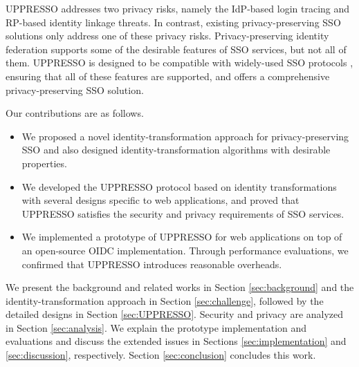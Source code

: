 
UPPRESSO addresses two privacy risks, namely the IdP-based login tracing and RP-based identity linkage threats. In contrast, existing privacy-preserving SSO solutions \cite{BrowserID, SPRESSO, NIST2017draft, FirefoxAccount} only address one of these privacy risks. Privacy-preserving identity federation \cite{PseudoID, ELPASSO, UnlimitID,Opaak,uprov,hyperledge-idemix} supports some of the desirable features of SSO services, but not all of them. UPPRESSO is designed to be compatible with widely-used SSO protocols \cite{OpenIDConnect, rfc6749, SAML, NIST2017draft}, ensuring that all of these features are supported, and offers a comprehensive privacy-preserving SSO solution.

Our contributions are as follows.
\vspace{-\topsep}\begin{itemize}
\setlength{\topsep}{0pt}
\setlength{\partopsep}{0pt}
\setlength{\itemsep}{0pt}
\setlength{\parsep}{0pt}
\setlength{\parskip}{0pt}
\item We proposed a novel identity-transformation approach for privacy-preserving SSO and also designed identity-transformation algorithms with desirable properties.
\item We developed the UPPRESSO protocol based on identity transformations    with several designs specific to web applications, and proved that UPPRESSO satisfies the security and privacy requirements of SSO services.
\item We implemented a prototype of UPPRESSO for web applications on top of an open-source OIDC implementation. Through performance evaluations, we confirmed that UPPRESSO introduces reasonable overheads.
\end{itemize}


We present the background and related works in Section \ref{sec:background} and the identity-transformation approach in Section \ref{sec:challenge}, followed by the detailed designs in Section \ref{sec:UPPRESSO}. 
Security and privacy are analyzed in Section \ref{sec:analysis}.
 We explain the prototype implementation and evaluations
  and discuss the extended issues 
    in Sections \ref{sec:implementation} and \ref{sec:discussion}, respectively.
Section \ref{sec:conclusion} concludes this work.

